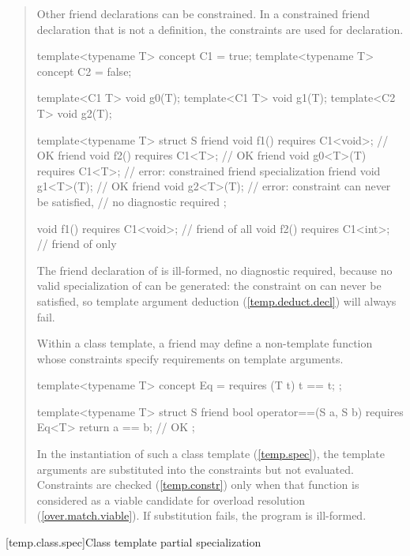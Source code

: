 \begin{quote}
\begin{addedblock}
\pnum
\enternote
Other friend declarations can be constrained. In a constrained friend 
declaration that is not a definition, the constraints are used for declaration.
\exitnote
\enterexample
\begin{codeblock}
template<typename T> concept C1 = true;
template<typename T> concept C2 = false;

template<C1 T> void g0(T);
template<C1 T> void g1(T);
template<C2 T> void g2(T);

template<typename T>
  struct S {
    friend void f1() requires C1<void>;  // OK
    friend void f2() requires C1<T>;     // OK
    friend void g0<T>(T) requires C1<T>; // error: constrained friend specialization
    friend void g1<T>(T);                // OK
    friend void g2<T>(T);                // error: constraint can never be satisfied, 
                                         // no diagnostic required
  };

void f1() requires C1<void>;   // friend of all 
void f2() requires C1<int>;    // friend of only 
\end{codeblock}
The friend declaration of  is ill-formed, no
diagnostic required, because no valid specialization of 
can be generated: the constraint on  can never
be satisfied, so template argument deduction
(\ref{temp.deduct.decl}) will always fail.
\exitexample

\pnum
\enternote
Within a class template, a friend may define a non-template function
whose constraints specify requirements on template arguments.
\enterexample
\begin{codeblock}
template<typename T> concept Eq = requires (T t) { t == t; };

template<typename T>
  struct S {
    friend bool operator==(S a, S b) requires Eq<T> { return a == b; } // OK
  };
\end{codeblock}
\exitexample
In the instantiation of such a class template (\ref{temp.spec}), the 
template arguments are substituted into the constraints but not evaluated.
Constraints are checked (\ref{temp.constr}) only when
that function is considered as a viable candidate for overload resolution
(\ref{over.match.viable}). If substitution fails, the program is ill-formed.
\exitnote
\end{addedblock}
\end{quote}


[temp.class.spec]{Class template partial specialization}

